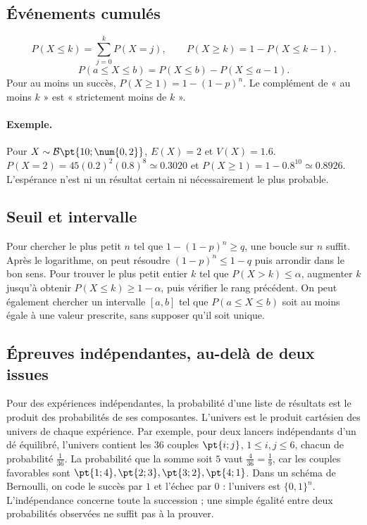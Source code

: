 \subsection{Événements cumulés}
\[P(X\le k)=\sum_{j=0}^kP(X=j),\qquad P(X\ge k)=1-P(X\le k-1).\]\[P(a\le X\le b)=P(X\le b)-P(X\le a-1).\]
Pour au moins un succès, $P(X\ge1)=1-(1-p)^n$. Le complément de « au moins $k$ » est « strictement moins de $k$ ».
\paragraph{Exemple.} Pour $X\sim\mathcal B\pt{10;\num{0,2}}$, $E(X)=2$ et $V(X)=\num{1,6}$. $P(X=2)=45(\num{0,2})^2(\num{0,8})^8\simeq\num{0,3020}$ et $P(X\ge1)=1-\num{0,8}^{10}\simeq\num{0,8926}$. L'espérance n'est ni un résultat certain ni nécessairement le plus probable.
\subsection{Seuil et intervalle}
Pour chercher le plus petit $n$ tel que $1-(1-p)^n\ge q$, une boucle sur $n$ suffit. Après le logarithme, on peut résoudre $(1-p)^n\le1-q$ puis arrondir dans le bon sens.
Pour trouver le plus petit entier $k$ tel que $P(X>k)\le\alpha$, augmenter $k$ jusqu'à obtenir $P(X\le k)\ge1-\alpha$, puis vérifier le rang précédent. On peut également chercher un intervalle $[a,b]$ tel que $P(a\le X\le b)$ soit au moins égale à une valeur prescrite, sans supposer qu'il soit unique.
\subsection{Épreuves indépendantes, au-delà de deux issues}
Pour des expériences indépendantes, la probabilité d'une liste de résultats est le produit des probabilités de ses composantes. L'univers est le produit cartésien des univers de chaque expérience. Par exemple, pour deux lancers indépendants d'un dé équilibré, l'univers contient les $36$ couples $\pt{i;j}$, $1\le i,j\le6$, chacun de probabilité $\frac{1}{36}$. La probabilité que la somme soit $5$ vaut $\frac{4}{36}=\frac{1}{9}$, car les couples favorables sont $\pt{1;4},\pt{2;3},\pt{3;2},\pt{4;1}$.
Dans un schéma de Bernoulli, on code le succès par $1$ et l'échec par $0$ : l'univers est $\{0,1\}^n$. L'indépendance concerne toute la succession ; une simple égalité entre deux probabilités observées ne suffit pas à la prouver.


\mxnewpage
